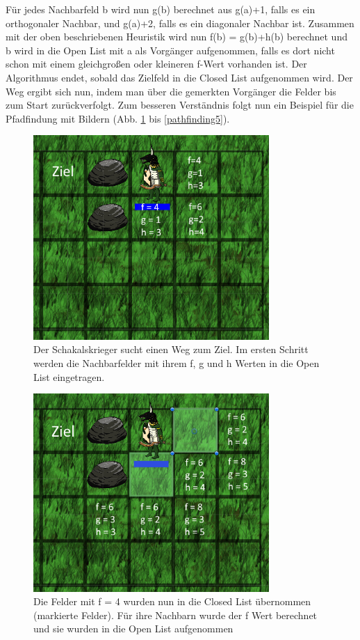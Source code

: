 \documentclass[extern,palatino]{cgBA}
\begin{document}
Für jedes Nachbarfeld b wird nun g(b) berechnet aus g(a)+1, falls es ein orthogonaler Nachbar, und g(a)+2, falls es ein diagonaler Nachbar ist. Zusammen mit der oben beschriebenen Heuristik wird nun f(b) = g(b)+h(b) berechnet und b wird in die Open List mit a als Vorgänger aufgenommen, falls es dort nicht schon mit einem gleichgroßen oder kleineren f-Wert vorhanden ist. Der Algorithmus endet, sobald das Zielfeld in die Closed List aufgenommen wird. Der Weg ergibt sich nun, indem man über die gemerkten Vorgänger die Felder bis zum Start zurückverfolgt. Zum besseren Verständnis folgt nun ein Beispiel für die Pfadfindung mit Bildern (Abb. \ref{pathfinding1} bis \ref{pathfinding5}).
\begin{figure}[H]
	\centering
	\includegraphics[width=0.8\textwidth]{pathfinding1.png}
	\caption{Der Schakalskrieger sucht einen Weg zum Ziel. Im ersten Schritt werden die Nachbarfelder mit ihrem f, g und h Werten in die Open List eingetragen.}
	\label{pathfinding1}
\end{figure}
\begin{figure}[H]
	\centering
	\includegraphics[width=0.8\textwidth]{pathfinding2.png}
	\caption{Die Felder mit f = 4 wurden nun in die Closed List übernommen (markierte Felder). Für ihre Nachbarn wurde der f Wert berechnet und sie wurden in die Open List aufgenommen}
	\label{pathfinding2}
\end{figure}
\end{document}
